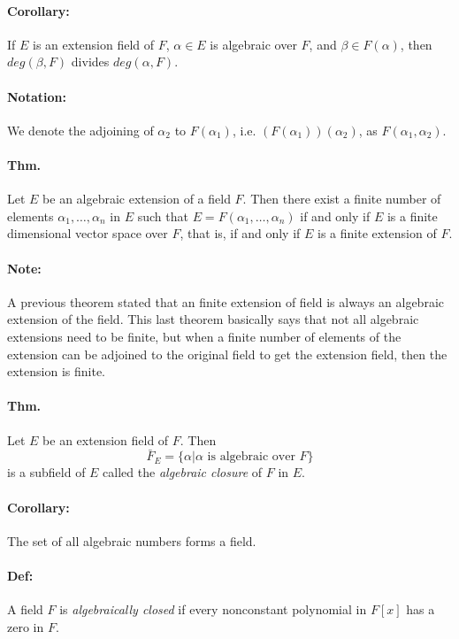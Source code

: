 \documentclass[10pt,a4paper]{article}
\begin{document}
\paragraph{Corollary:} If $E$ is an extension field of $F$, $\alpha \in E$ is algebraic over $F$, and $\beta \in F(\alpha)$, then $deg(\beta, F)$ divides $deg(\alpha, F)$.

\paragraph{Notation:} We denote the adjoining of $\alpha_2$ to $F(\alpha_1)$, i.e. $(F(\alpha_1))(\alpha_2)$, as $F(\alpha_1, \alpha_2)$.

\paragraph{Thm.} Let $E$ be an algebraic extension of a field $F$. Then there exist a finite number of elements $\alpha_1, \dots, \alpha_n$ in $E$ such that $E = F(\alpha_1, \dots, \alpha_n)$ if and only if $E$ is a finite dimensional vector space over $F$, that is, if and only if $E$ is a finite extension of $F$.

\paragraph{Note:} A previous theorem stated that an finite extension of field is always an algebraic extension of the field. This last theorem basically says that not all algebraic extensions need to be finite, but when a finite number of elements of the extension can be adjoined to the original field to get the extension field, then the extension is finite.

\paragraph{Thm.} Let $E$ be an extension field of $F$. Then 
$$ \bar{F}_E = \{ \alpha | \alpha \text{ is algebraic over } F \}$$ 
is a subfield of $E$ called the \textit{algebraic closure} of $F$ in $E$.

\paragraph{Corollary:} The set of all algebraic numbers forms a field. 

\paragraph{Def:} A field $F$ is \textit{algebraically closed} if every nonconstant polynomial in $F[x]$ has a zero in $F$.
\end{document}
